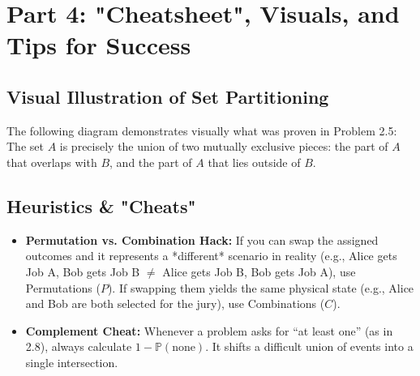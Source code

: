 \documentclass[11pt, letterpaper]{article}
\theoremstyle{definition}
\theoremstyle{remark}
\newcommand{\Prob}{\mathbb{P}}
\newcommand{\comp}[1]{\overline{#1}}
\begin{document}
\section{Part 4: "Cheatsheet", Visuals, and Tips for Success}

\subsection{Visual Illustration of Set Partitioning}
The following diagram demonstrates visually what was proven in Problem 2.5: The set $A$ is precisely the union of two mutually exclusive pieces: the part of $A$ that overlaps with $B$, and the part of $A$ that lies outside of $B$.

\begin{center}
\end{center}

\subsection{Heuristics \& "Cheats"}
\begin{itemize}
    \item \textbf{Permutation vs. Combination Hack:} If you can swap the assigned outcomes and it represents a *different* scenario in reality (e.g., Alice gets Job A, Bob gets Job B $\neq$ Alice gets Job B, Bob gets Job A), use Permutations ($P$). If swapping them yields the same physical state (e.g., Alice and Bob are both selected for the jury), use Combinations ($C$).
    \item \textbf{Complement Cheat:} Whenever a problem asks for ``at least one'' (as in 2.8), always calculate $1 - \Prob(\text{none})$. It shifts a difficult union of events into a single intersection.
\end{itemize}
\end{document}
